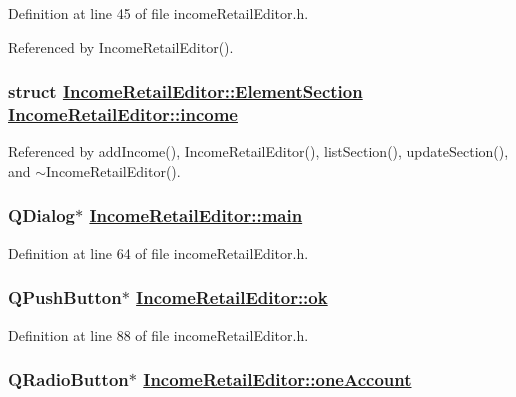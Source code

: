 Definition at line 45 of file income\-Retail\-Editor.h.

Referenced by Income\-Retail\-Editor().\hypertarget{classIncomeRetailEditor_r4}{
\subsubsection[income]{\setlength{\rightskip}{0pt plus 5cm}struct \hyperlink{structIncomeRetailEditor_1_1ElementSection}{Income\-Retail\-Editor::Element\-Section}  \hyperlink{classIncomeRetailEditor_r4}{Income\-Retail\-Editor::income}}}
\label{classIncomeRetailEditor_r4}




Referenced by add\-Income(), Income\-Retail\-Editor(), list\-Section(), update\-Section(), and $\sim$Income\-Retail\-Editor().\hypertarget{classIncomeRetailEditor_r7}{
\subsubsection[main]{\setlength{\rightskip}{0pt plus 5cm}QDialog$\ast$ \hyperlink{classIncomeRetailEditor_r7}{Income\-Retail\-Editor::main}}}
\label{classIncomeRetailEditor_r7}


Definition at line 64 of file income\-Retail\-Editor.h.\hypertarget{classIncomeRetailEditor_r31}{
\subsubsection[ok]{\setlength{\rightskip}{0pt plus 5cm}QPush\-Button$\ast$ \hyperlink{classIncomeRetailEditor_r31}{Income\-Retail\-Editor::ok}}}
\label{classIncomeRetailEditor_r31}


Definition at line 88 of file income\-Retail\-Editor.h.\hypertarget{classIncomeRetailEditor_r9}{
\subsubsection[oneAccount]{\setlength{\rightskip}{0pt plus 5cm}QRadio\-Button$\ast$ \hyperlink{classIncomeRetailEditor_r9}{Income\-Retail\-Editor::one\-Account}}}
\label{classIncomeRetailEditor_r9}



